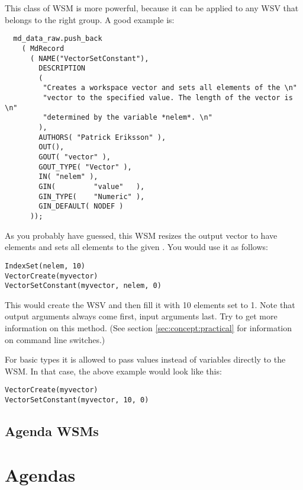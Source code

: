 This class of WSM is more powerful, because it can be applied to any
WSV that belongs to the right group. A good example is:

{\small
\begin{verbatim}
  md_data_raw.push_back
    ( MdRecord
      ( NAME("VectorSetConstant"),
        DESCRIPTION
        (
         "Creates a workspace vector and sets all elements of the \n"
         "vector to the specified value. The length of the vector is \n"
         "determined by the variable *nelem*. \n"
        ),
        AUTHORS( "Patrick Eriksson" ),
        OUT(),
        GOUT( "vector" ),
        GOUT_TYPE( "Vector" ),
        IN( "nelem" ),
        GIN(         "value"   ),
        GIN_TYPE(    "Numeric" ),
        GIN_DEFAULT( NODEF )
      ));
\end{verbatim}
}

\noindent
As you probably have guessed, this WSM resizes the output vector to have  elements and sets all elements to the given .
You would use it as follows:

{\small
\begin{verbatim}
IndexSet(nelem, 10)
VectorCreate(myvector)
VectorSetConstant(myvector, nelem, 0)
\end{verbatim}
}

\noindent
This would create the WSV  and then fill it with 10
elements set to 1. Note that output arguments always come first, input
arguments last. Try  to
get more information on this method. (See section \ref{sec:concept:practical}
for information on command line switches.)

\noindent
For basic types it is allowed to pass values instead of variables directly to
the WSM. In that case, the above example would look like this:

{\small
\begin{verbatim}
VectorCreate(myvector)
VectorSetConstant(myvector, 10, 0)
\end{verbatim}
}


\subsection{Agenda WSMs}

\section{Agendas}
\label{sec:agendas:agendas}

